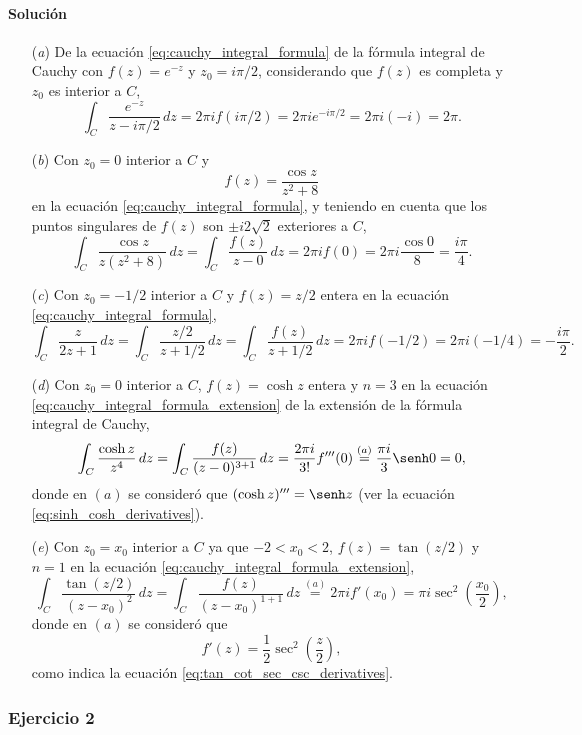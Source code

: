 \documentclass[a4paper]{report}
\begin{document}
\paragraph{Solución} 
\begin{enumerate}
 \item[(\textit{a})] De la ecuación \ref{eq:cauchy_integral_formula} de la fórmula integral de Cauchy con \(f(z)=e^{-z}\)   y \(z_0=i\pi/2\), considerando que \(f(z)\) es completa y \(z_0\) es interior a \(C\),
 \[
  \int_C\frac{e^{-z}}{z-i\pi/2}\,dz=2\pi if(i\pi/2)=2\pi i e^{-i\pi/2}=2\pi i(-i)=2\pi.
 \]
 \item[(\textit{b})] Con \(z_0=0\) interior a \(C\) y 
 \[
  f(z)=\frac{\cos z}{z^2+8}
 \]
 en la ecuación \ref{eq:cauchy_integral_formula}, y teniendo en cuenta que los puntos singulares de \(f(z)\) son \(\pm i2\sqrt{2}\) exteriores a \(C\),
 \[
  \int_C\frac{\cos z}{z(z^2+8)}\,dz=\int_C\frac{f(z)}{z-0}\,dz=2\pi if(0)=2\pi i\frac{\cos0}{8}=\frac{i\pi}{4}.
 \]
 \item[(\textit{c})] Con \(z_0=-1/2\) interior a \(C\) y \(f(z)=z/2\) entera en la ecuación \ref{eq:cauchy_integral_formula},
 \[
  \int_C\frac{z}{2z+1}\,dz=\int_C\frac{z/2}{z+1/2}\,dz=\int_C\frac{f(z)}{z+1/2}\,dz=2\pi if(-1/2)=2\pi i(-1/4)=-\frac{i\pi}{2}.
 \]
 \item[(\textit{d})] Con \(z_0=0\) interior a \(C\), \(f(z)=\cosh z\) entera y \(n=3\) en la ecuación \ref{eq:cauchy_integral_formula_extension} de la extensión de la fórmula integral de Cauchy,
 \[
  \int_C\frac{\cosh z}{z^4}\,dz=\int_C\frac{f(z)}{(z-0)^{3+1}}\,dz=\frac{2\pi i}{3!}f'''(0)\overset{(a)}{=}\frac{\pi i}{3}\senh0=0,
 \]
 donde en \((a)\) se consideró que \((\cosh z)'''=\senh z\) (ver la ecuación \ref{eq:sinh_cosh_derivatives}).
 \item[(\textit{e})] Con \(z_0=x_0\) interior a \(C\) ya que \(-2<x_0<2\), \(f(z)=\tan(z/2)\) y \(n=1\) en la ecuación \ref{eq:cauchy_integral_formula_extension},
 \[
  \int_C\frac{\tan(z/2)}{(z-x_0)^2}\,dz=\int_C\frac{f(z)}{(z-x_0)^{1+1}}\,dz\overset{(a)}{=}2\pi if'(x_0)=\pi i\sec^2\left(\frac{x_0}{2}\right),
 \]
 donde en \((a)\) se consideró que 
 \[
  f'(z)=\frac{1}{2}\sec^2\left(\frac{z}{2}\right),
 \]
 como indica la ecuación \ref{eq:tan_cot_sec_csc_derivatives}.
\end{enumerate}

\subsubsection*{Ejercicio 2}
\end{document}
